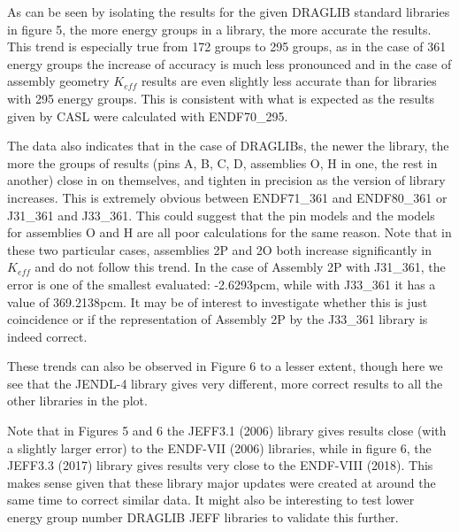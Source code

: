 \documentclass[12pt]{article}
\begin{document}
As can be seen by isolating the results for the given DRAGLIB standard libraries in figure 5, the more energy groups in a library, the more accurate the results. This trend is especially true from 172 groups to 295 groups, as in the case of 361 energy groups the increase of accuracy is much less pronounced and in the case of assembly geometry $K_{eff}$ results are even slightly less accurate than for libraries with 295 energy groups. This is consistent with what is expected as the results given by CASL were calculated with ENDF70\_295. 

The data also indicates that in the case of DRAGLIBs, the newer the library, the more the groups of results (pins A, B, C, D, assemblies O, H in one, the rest in another) close in on themselves, and tighten in precision as the version of library increases. This is extremely obvious between ENDF71\_361 and ENDF80\_361 or J31\_361 and J33\_361. This could suggest that the pin models and the models for assemblies O and H are all poor calculations for the same reason. Note that in these two particular cases, assemblies 2P and 2O both increase significantly in $K_{eff}$ and do not follow this trend. In the case of Assembly 2P with J31\_361, the error is one of the smallest evaluated: -2.6293pcm, while with J33\_361 it has a value of 369.2138pcm. It may be of interest to investigate whether this is just coincidence or if the representation of Assembly 2P by the J33\_361 library is indeed correct.

These trends can also be observed in Figure 6 to a lesser extent, though here we see that the JENDL-4 library gives very different, more correct results to all the other libraries in the plot. 

Note that in Figures 5 and 6 the JEFF3.1 (2006) library gives results close (with a slightly larger error) to the ENDF-VII (2006) libraries, while in figure 6, the JEFF3.3 (2017) library gives results very close to the ENDF-VIII (2018). This makes sense given that these library major updates were created at around the same time to correct similar data. It might also be interesting to test lower energy group number DRAGLIB JEFF libraries to validate this further. 
\end{document}
